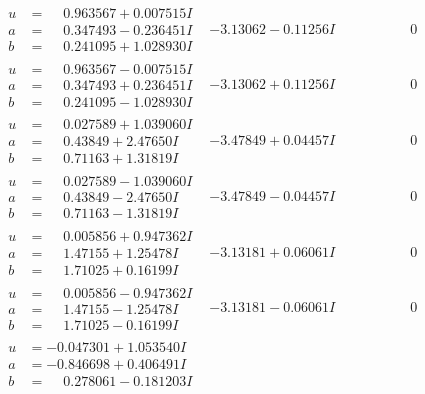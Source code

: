 \documentclass[1p]{elsarticle_modified}
\theoremstyle{definition}
\begin{document}
$$\begin{array}{c|c|c}
\begin{aligned}
u &= \phantom{-}0.963567 + 0.007515 I \\
a &= \phantom{-}0.347493 - 0.236451 I \\
b &= \phantom{-}0.241095 + 1.028930 I\end{aligned}
 & -3.13062 - 0.11256 I & \phantom{-0.000000 } 0 \\ \hline\begin{aligned}
u &= \phantom{-}0.963567 - 0.007515 I \\
a &= \phantom{-}0.347493 + 0.236451 I \\
b &= \phantom{-}0.241095 - 1.028930 I\end{aligned}
 & -3.13062 + 0.11256 I & \phantom{-0.000000 } 0 \\ \hline\begin{aligned}
u &= \phantom{-}0.027589 + 1.039060 I \\
a &= \phantom{-}0.43849 + 2.47650 I \\
b &= \phantom{-}0.71163 + 1.31819 I\end{aligned}
 & -3.47849 + 0.04457 I & \phantom{-0.000000 } 0 \\ \hline\begin{aligned}
u &= \phantom{-}0.027589 - 1.039060 I \\
a &= \phantom{-}0.43849 - 2.47650 I \\
b &= \phantom{-}0.71163 - 1.31819 I\end{aligned}
 & -3.47849 - 0.04457 I & \phantom{-0.000000 } 0 \\ \hline\begin{aligned}
u &= \phantom{-}0.005856 + 0.947362 I \\
a &= \phantom{-}1.47155 + 1.25478 I \\
b &= \phantom{-}1.71025 + 0.16199 I\end{aligned}
 & -3.13181 + 0.06061 I & \phantom{-0.000000 } 0 \\ \hline\begin{aligned}
u &= \phantom{-}0.005856 - 0.947362 I \\
a &= \phantom{-}1.47155 - 1.25478 I \\
b &= \phantom{-}1.71025 - 0.16199 I\end{aligned}
 & -3.13181 - 0.06061 I & \phantom{-0.000000 } 0 \\ \hline\begin{aligned}
u &= -0.047301 + 1.053540 I \\
a &= -0.846698 + 0.406491 I \\
b &= \phantom{-}0.278061 - 0.181203 I\end{aligned}

\end{array}$$
\end{document}

